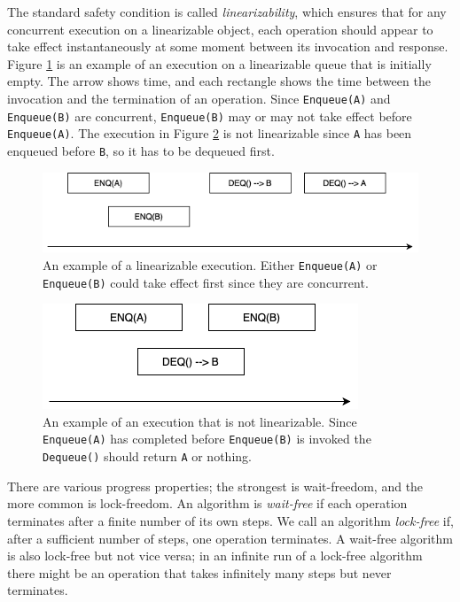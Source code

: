 \documentclass[10pt]{article}
\theoremstyle{definition}
\begin{document}
The standard safety condition is called \textit{linearizability}, which ensures that for any concurrent execution on a linearizable object, each operation should appear to take effect instantaneously at some moment between its invocation and response. Figure \ref{fig::goodexample} is an example of an execution on a linearizable  queue that is initially empty. The arrow shows time, and each rectangle shows the time between the invocation and the termination of an operation. Since \texttt{Enqueue(A)} and \texttt{Enqueue(B)} are concurrent, \texttt{Enqueue(B)} may or may not take effect before \texttt{Enqueue(A)}. The execution in Figure \ref{fig::badexample} is not linearizable since \texttt{A} has been enqueued before \texttt{B}, so it has to be dequeued first.

\begin{figure}[hbt]
  \center\includegraphics[scale=0.5]{pics/good}
  \caption{\label{fig::goodexample}An example of a linearizable execution. Either \texttt{Enqueue(A)} or \texttt{Enqueue(B)} could take effect first since they are concurrent.}
\end{figure}

\begin{figure}[hbt]
  \center\includegraphics[scale=0.5]{pics/bad}
  \caption{\label{fig::badexample}An example of an execution that is not linearizable. Since \texttt{Enqueue(A)} has completed before \texttt{Enqueue(B)} is invoked the \texttt{Dequeue()} should return \texttt{A} or nothing.}
\end{figure}


There are various progress properties; the strongest is wait-freedom, and the more common is lock-freedom. An algorithm is \textit{wait-free} if each operation terminates after a finite number of its own steps. We call an algorithm \textit{lock-free} if, after a sufficient number of steps, one operation terminates. A wait-free algorithm is also lock-free but not vice versa; in an infinite run of a lock-free algorithm there might be an operation that takes infinitely many steps but never terminates.
\end{document}
